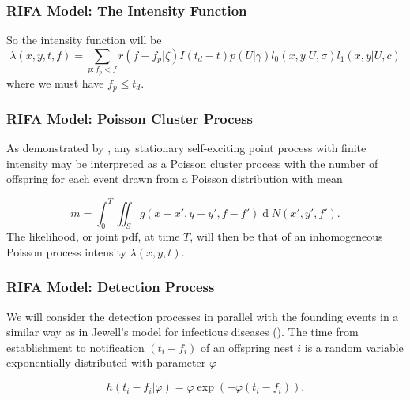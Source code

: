 \documentclass[9pt, xcolor={dvipsnames,svgnames,table}]{beamer}
\renewcommand{\d}[1]{\ensuremath{\operatorname{d}\!{#1}}}
\begin{document}
    
 \begin{frame}
    \frametitle{RIFA Model: The Intensity Function}
    So \textcolor{PineGreen}{the intensity function will be}
    \begin{equation*}
        \lambda(x, y, t, f) = \sum_{p:f_p < f} r(f - f_p | \zeta) I(t_d - t) p(U | \gamma) l_0(x, y | U, \sigma) l_1(x, y | U, c)
    \end{equation*}
    where we must have $f_p\leq t_d$.
\end{frame}




\begin{frame}
\frametitle{RIFA Model: Poisson Cluster Process}
    As demonstrated by \cite{Hawkes74}, \textcolor{PineGreen}{any stationary self-exciting point process with finite intensity may be interpreted as a Poisson cluster process} with the number of offspring for each event drawn from a Poisson distribution with mean 

    \begin{equation*}
        m = \int_0^T \iint_S g(x-x', y-y', f-f')\d N(x', y', f').
    \end{equation*}
    The likelihood, or joint pdf, at time $T$, will then be that of an inhomogeneous Poisson process intensity $\lambda(x, y, t)$.
\end{frame}




\begin{frame}
\frametitle{RIFA Model: Detection Process}
    \textcolor{PineGreen}{We will consider the detection processes in parallel with the founding events} in a similar way as in Jewell's model for infectious diseases (\cite{Jewell}).
    The time from establishment to notification $(t_i - f_i)$ of an offspring nest $i$ is a random variable exponentially distributed with parameter $\varphi$

    \begin{equation*}
    h(t_{i} - f_{i} | \varphi) = \varphi \exp (- \varphi(t_{i} - f_{i})).
    \end{equation*}
\end{frame}
\end{document}
